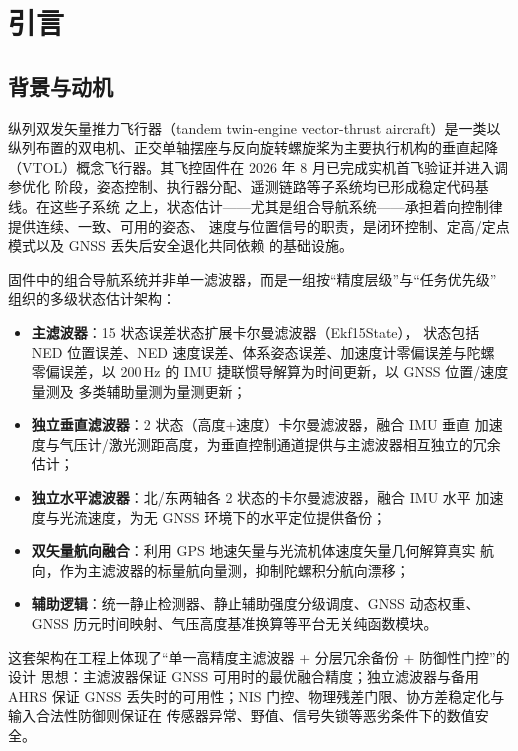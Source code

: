 \section{引言}

\subsection{背景与动机}

纵列双发矢量推力飞行器（tandem twin-engine vector-thrust aircraft）是一类以
纵列布置的双电机、正交单轴摆座与反向旋转螺旋桨为主要执行机构的垂直起降
（VTOL）概念飞行器。其飞控固件在 2026 年 8 月已完成实机首飞验证并进入调参优化
阶段，姿态控制、执行器分配、遥测链路等子系统均已形成稳定代码基线。在这些子系统
之上，状态估计——尤其是组合导航系统——承担着向控制律提供连续、一致、可用的姿态、
速度与位置信号的职责，是闭环控制、定高/定点模式以及 GNSS 丢失后安全退化共同依赖
的基础设施。

固件中的组合导航系统并非单一滤波器，而是一组按``精度层级''与``任务优先级''
组织的多级状态估计架构：
\begin{itemize}
  \item \textbf{主滤波器}：15 状态误差状态扩展卡尔曼滤波器（Ekf15State），
    状态包括 NED 位置误差、NED 速度误差、体系姿态误差、加速度计零偏误差与陀螺
    零偏误差，以 200\,Hz 的 IMU 捷联惯导解算为时间更新，以 GNSS 位置/速度量测及
    多类辅助量测为量测更新；
  \item \textbf{独立垂直滤波器}：2 状态（高度+速度）卡尔曼滤波器，融合 IMU 垂直
    加速度与气压计/激光测距高度，为垂直控制通道提供与主滤波器相互独立的冗余估计；
  \item \textbf{独立水平滤波器}：北/东两轴各 2 状态的卡尔曼滤波器，融合 IMU 水平
    加速度与光流速度，为无 GNSS 环境下的水平定位提供备份；
  \item \textbf{双矢量航向融合}：利用 GPS 地速矢量与光流机体速度矢量几何解算真实
    航向，作为主滤波器的标量航向量测，抑制陀螺积分航向漂移；
  \item \textbf{辅助逻辑}：统一静止检测器、静止辅助强度分级调度、GNSS 动态权重、
    GNSS 历元时间映射、气压高度基准换算等平台无关纯函数模块。
\end{itemize}

这套架构在工程上体现了``单一高精度主滤波器 + 分层冗余备份 + 防御性门控''的设计
思想：主滤波器保证 GNSS 可用时的最优融合精度；独立滤波器与备用 AHRS 保证 GNSS
丢失时的可用性；NIS 门控、物理残差门限、协方差稳定化与输入合法性防御则保证在
传感器异常、野值、信号失锁等恶劣条件下的数值安全。

